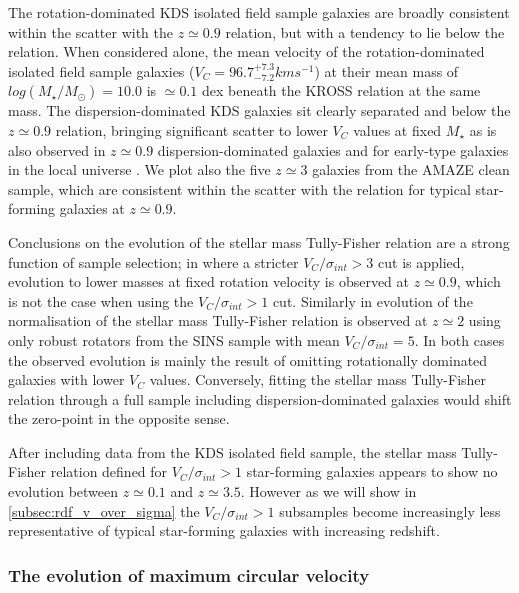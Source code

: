 \documentclass[fleqn,usenatbib]{mn2e}
\begin{document}
The rotation-dominated KDS isolated field sample galaxies are broadly consistent within the scatter with the $z\simeq0.9$ relation, but with a tendency to lie below the relation.
When considered alone, the mean velocity of the rotation-dominated isolated field sample galaxies ($V_{C} = 96.7^{+7.3}_{-7.2}kms^{-1}$) at their mean mass of $log(M_{\star}/M_{\odot})=10.0$ is $\simeq0.1$ dex beneath the KROSS relation at the same mass.
The dispersion-dominated KDS galaxies sit clearly separated and below the $z\simeq0.9$ relation, bringing significant scatter to lower $V_{C}$ values at fixed $M_{\star}$ as is also observed in $z\simeq0.9$ dispersion-dominated galaxies and for early-type galaxies in the local universe \citep[e.g.][]{Romanowsky2012}. 
We plot also the five $z\simeq3$ galaxies from the AMAZE clean sample, which are consistent within the scatter with the relation for typical star-forming galaxies at $z\simeq0.9$.

Conclusions on the evolution of the stellar mass Tully-Fisher relation are a strong function of sample selection; in \cite{Tiley2016a} where a stricter $V_{C}/\sigma_{int} > 3$ cut is applied, evolution to lower masses at fixed rotation velocity is observed at $z\simeq0.9$, which is not the case when using the $V_{C}/\sigma_{int} > 1$ cut.
Similarly in \cite{Cresci2009} evolution of the normalisation of the stellar mass Tully-Fisher relation is observed at $z\simeq2$ using only robust rotators from the SINS sample with mean $V_{C}/\sigma_{int} = 5$.
In both cases the observed evolution is mainly the result of omitting rotationally dominated galaxies with lower $V_{C}$ values.
Conversely, fitting the stellar mass Tully-Fisher relation through a full sample including dispersion-dominated galaxies would shift the zero-point in the opposite sense.

After including data from the KDS isolated field sample, the stellar mass Tully-Fisher relation defined for $V_{C}/\sigma_{int} > 1$ star-forming galaxies appears to show no evolution between $z\simeq0.1$ and $z\simeq3.5$.
However as we will show in \cref{subsec:rdf_v_over_sigma} the $V_{C}/\sigma_{int} > 1$ subsamples become increasingly less representative of typical star-forming galaxies with increasing redshift.  

\subsubsection{The evolution of maximum circular velocity}\label{subsubsec:v_evolution}
\end{document}

